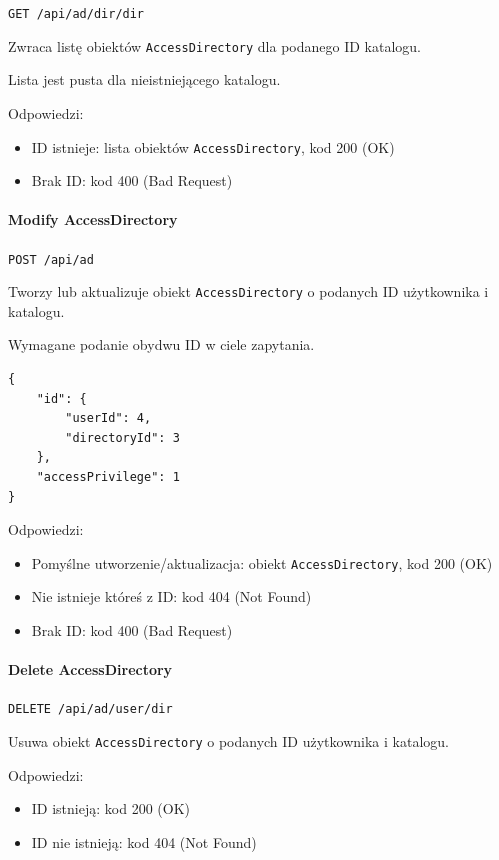 \documentclass[a4paper,twoside,12pt]{book}
\begin{document}
\texttt{GET /api/ad/dir/{dir}}

Zwraca listę obiektów \texttt{AccessDirectory} dla podanego ID katalogu.

Lista jest pusta dla nieistniejącego katalogu.

Odpowiedzi: 
\begin{itemize}
	\item ID istnieje: lista obiektów \texttt{AccessDirectory}, kod 200 (OK)
	\item Brak ID: kod 400 (Bad Request)
\end{itemize}

\paragraph{Modify AccessDirectory}

\texttt{POST /api/ad}

Tworzy lub aktualizuje obiekt \texttt{AccessDirectory} o podanych ID użytkownika i katalogu.

Wymagane podanie obydwu ID w ciele zapytania.

\begin{verbatim}
{
    "id": {
        "userId": 4,
        "directoryId": 3
    },
    "accessPrivilege": 1
}
\end{verbatim}

Odpowiedzi: 
\begin{itemize}
	\item Pomyślne utworzenie/aktualizacja: obiekt \texttt{AccessDirectory}, kod 200 (OK) 
	\item Nie istnieje któreś z ID: kod 404 (Not Found) 
	\item Brak ID: kod 400 (Bad Request)
\end{itemize}

\paragraph{Delete AccessDirectory}

\texttt{DELETE /api/ad/{user}/{dir}}

Usuwa obiekt \texttt{AccessDirectory} o podanych ID użytkownika i katalogu.

Odpowiedzi: 
\begin{itemize}
	\item ID istnieją: kod 200 (OK) 
	\item ID nie istnieją: kod 404 (Not Found)
\end{itemize}
\end{document}

